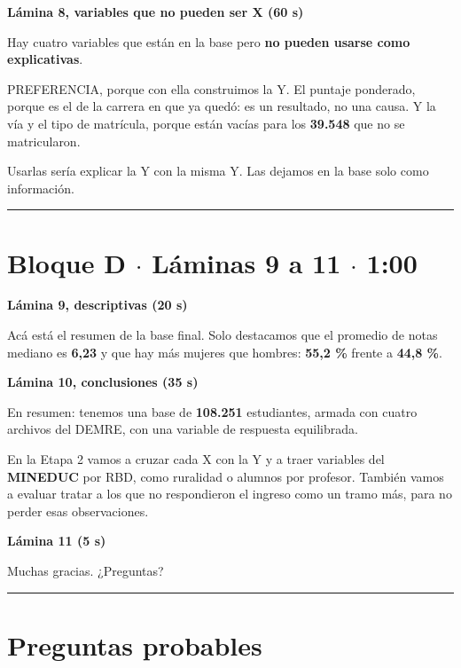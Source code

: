 \documentclass[11pt]{article}
\begin{document}
\textbf{Lámina 8, variables que no pueden ser X (60 s)}\par
\begin{guion}Hay cuatro variables que están en la base pero \textbf{no pueden usarse como explicativas}.\par PREFERENCIA, porque con ella construimos la Y. El puntaje ponderado, porque es el de la carrera en que ya quedó: es un resultado, no una causa. Y la vía y el tipo de matrícula, porque están vacías para los \textbf{39.548} que no se matricularon.\par Usarlas sería explicar la Y con la misma Y. Las dejamos en la base solo como información.\end{guion}

\medskip\hrule\medskip

\section*{Bloque D $\cdot$ Láminas 9 a 11 $\cdot$ 1:00}

\textbf{Lámina 9, descriptivas (20 s)}\par
\begin{guion}Acá está el resumen de la base final. Solo destacamos que el promedio de notas mediano es \textbf{6,23} y que hay más mujeres que hombres: \textbf{55,2 \%} frente a \textbf{44,8 \%}.\end{guion}

\textbf{Lámina 10, conclusiones (35 s)}\par
\begin{guion}En resumen: tenemos una base de \textbf{108.251} estudiantes, armada con cuatro archivos del DEMRE, con una variable de respuesta equilibrada.\par En la Etapa 2 vamos a cruzar cada X con la Y y a traer variables del \textbf{MINEDUC} por RBD, como ruralidad o alumnos por profesor. También vamos a evaluar tratar a los que no respondieron el ingreso como un tramo más, para no perder esas observaciones.\end{guion}

\textbf{Lámina 11 (5 s)}\par
\begin{guion}Muchas gracias. ¿Preguntas?\end{guion}

\medskip\hrule\medskip

\section*{Preguntas probables}
\end{document}
